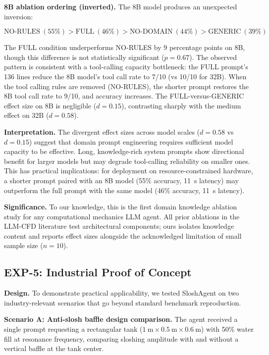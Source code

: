 \documentclass[11pt]{article}
\begin{document}
\textbf{8B ablation ordering (inverted).} The 8B model produces an unexpected inversion:

\begin{equation}
\text{NO-RULES}~(55\%) > \text{FULL}~(46\%) > \text{NO-DOMAIN}~(44\%) > \text{GENERIC}~(39\%)
\end{equation}

The FULL condition underperforms NO-RULES by 9 percentage points on 8B, though this difference is not statistically significant ($p = 0.67$). The observed pattern is consistent with a tool-calling capacity bottleneck: the FULL prompt's 136 lines reduce the 8B model's tool call rate to 7/10 (vs 10/10 for 32B). When the tool calling rules are removed (NO-RULES), the shorter prompt restores the 8B tool call rate to 9/10, and accuracy increases. The FULL-versus-GENERIC effect size on 8B is negligible ($d = 0.15$), contrasting sharply with the medium effect on 32B ($d = 0.58$).

\textbf{Interpretation.} The divergent effect sizes across model scales ($d = 0.58$ vs $d = 0.15$) suggest that domain prompt engineering requires sufficient model capacity to be effective. Long, knowledge-rich system prompts show directional benefit for larger models but may degrade tool-calling reliability on smaller ones. This has practical implications: for deployment on resource-constrained hardware, a shorter prompt paired with an 8B model (55\% accuracy, 11~s latency) may outperform the full prompt with the same model (46\% accuracy, 11~s latency).

\textbf{Significance.} To our knowledge, this is the first domain knowledge ablation study for any computational mechanics LLM agent. All prior ablations in the LLM-CFD literature test architectural components; ours isolates knowledge content and reports effect sizes alongside the acknowledged limitation of small sample size ($n = 10$).

\subsection{EXP-5: Industrial Proof of Concept}

\textbf{Design.} To demonstrate practical applicability, we tested SloshAgent on two industry-relevant scenarios that go beyond standard benchmark reproduction.

\textbf{Scenario A: Anti-slosh baffle design comparison.} The agent received a single prompt requesting a rectangular tank ($1~\text{m} \times 0.5~\text{m} \times 0.6~\text{m}$) with 50\% water fill at resonance frequency, comparing sloshing amplitude with and without a vertical baffle at the tank center.
\end{document}
